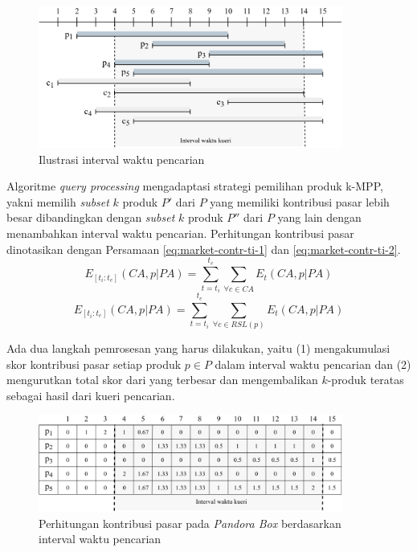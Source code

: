 \begin{figure}[h]
	\centering
	\includegraphics[width=10cm]{assets/img/bab3/timeline-interval.png}
	\caption{Ilustrasi interval waktu pencarian}
	\label{fig:timeline-kueri}
\end{figure}

Algoritme \textit{query processing} mengadaptasi strategi pemilihan produk k-MPP, yakni memilih \textit{subset} $k$ produk $P'$ dari $P$ yang memiliki kontribusi pasar lebih besar dibandingkan dengan \textit{subset} $k$ produk $P''$ dari $P$ yang lain \cite{kmpp} dengan menambahkan interval waktu pencarian. Perhitungan kontribusi pasar dinotasikan dengan Persamaan \ref{eq:market-contr-ti-1} dan \ref{eq:market-contr-ti-2}.
\begin{equation}\label{eq:market-contr-ti-2}
E_{[t_i:t_e]}(CA, p|PA) = \sum_{t=t_i}^{t_e} \sum_{\forall c \in CA} E_t(CA, p|PA)
\end{equation} 
\begin{equation}\label{eq:market-contr-ti-1}
E_{[t_i:t_e]}(CA, p|PA) = \sum_{t=t_i}^{t_e} \sum_{\forall c \in RSL(p)} E_t(CA, p|PA)
\end{equation} 

Ada dua langkah pemrosesan yang harus dilakukan, yaitu (1) mengakumulasi skor kontribusi pasar setiap produk $p \in P$ dalam interval waktu pencarian dan (2) mengurutkan total skor dari yang terbesar dan mengembalikan $k$-produk teratas sebagai hasil dari kueri pencarian. 

\begin{figure}[h]
	\centering
	\includegraphics[width=10cm]{assets/img/bab3/pbox-kueri.png}
	\caption{Perhitungan kontribusi pasar pada \textit{Pandora Box} berdasarkan interval waktu pencarian}
	\label{fig:pbox-kueri}
\end{figure}

